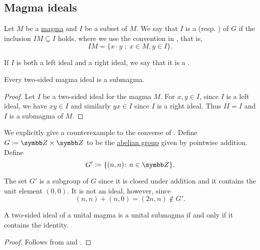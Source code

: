 \subsection{Magma ideals}\label{sec:magma_ideals}

\begin{Definition}\label{def:magma_ideal}
  Let \( M \) be a \hyperref[def:magma/magma]{magma} and \( I \) be a subset of \( M \). We say that \( I \) is a  (resp. ) of \( G \) if the inclusion \( IM \subseteq I \) holds, where we use the convention in , that is,
  \begin{equation*}
    IM = \{ x \cdot y \;\colon\; x \in M, y \in I \}.
  \end{equation*}

  If \( I \) is both a left ideal and a right ideal, we say that it is a .
\end{Definition}

\begin{Proposition}\label{thm:magma_ideal_is_submagma}
  Every two-sided magma ideal is a submagma.
\end{Proposition}
\begin{proof}
  Let \( I \) be a two-sided ideal for the magma \( M \). For \( x, y \in I \), since \( I \) is a left ideal, we have \( xy \in I \) and similarly \( yx \in I \) since \( I \) is a right ideal. Thus \( II = I \) and \( I \) is a submagma of \( M \).
\end{proof}

\begin{Example}\label{ex:subgroup_is_not_ideal}
  We explicitly give a counterexample to the converse of . Define \( G \coloneqq \BZ \times \BZ \) to be the \hyperref[def:abelian_group]{abelian group} given by pointwise addition. Define
  \begin{equation*}
    G' \coloneqq \{ (n, n) \colon n \in \BZ \}.
  \end{equation*}

  The set \( G' \) is a subgroup of \( G \) since it is closed under addition and it contains the unit element \( (0, 0) \). It is not an ideal, however, since
  \begin{equation*}
    (n, n) + (n, 0) = (2n, n) \not\in G'.
  \end{equation*}
\end{Example}

\begin{Proposition}\label{thm:unital_magma_ideal_is_submagma_iff_contains_identity}
  A two-sided ideal of a unital magma is a unital submagma if and only if it contains the identity.
\end{Proposition}
\begin{proof}
  Follows from  and .
\end{proof}

